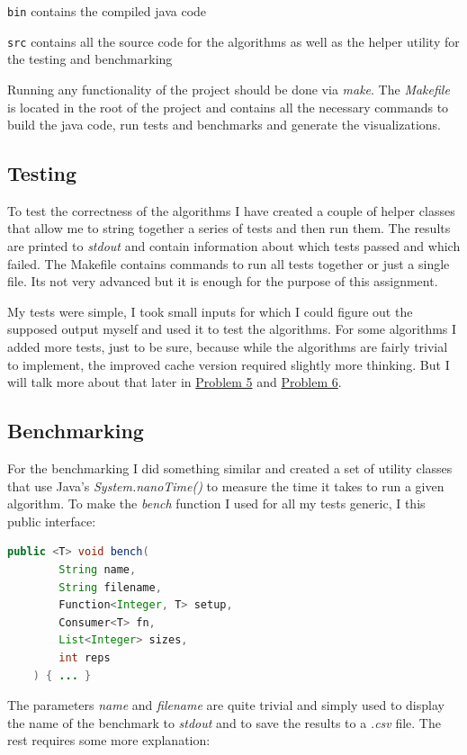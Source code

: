 \documentclass[12pt]{article}
\begin{document}
\texttt{bin} contains the compiled java code

\texttt{src} contains all the source code for the algorithms as well as the helper utility
for the testing and benchmarking

Running any functionality of the project should be done via \emph{make}. The \emph{Makefile}
is located in the root of the project and contains all the necessary commands to build the java code,
run tests and benchmarks and generate the visualizations.

\subsection{Testing}

To test the correctness of the algorithms I have created a couple of helper classes that
allow me to string together a series of tests and then run them. The results are printed
to \emph{stdout} and contain information about which tests passed and which failed. The 
Makefile contains commands to run all tests together or just a single file. Its not very
advanced but it is enough for the purpose of this assignment.

My tests were simple, I took small inputs for which I could figure out the supposed
output myself and used it to test the algorithms. For some algorithms I added more tests, just
to be sure, because while the algorithms are fairly trivial to implement, the improved cache
version required slightly more thinking. But I will talk more about that later in \hyperlink{p5}{Problem 5} and \hyperlink{p6}{Problem 6}. 

\subsection{Benchmarking}

For the benchmarking I did something similar and created a set of utility classes that use Java's
\emph{System.nanoTime()} to measure the time it takes to run a given algorithm. To make the 
\emph{bench} function I used for all my tests generic, I this public interface:

\begin{lstlisting}[language=Java]
    public <T> void bench(
        String name, 
        String filename,
        Function<Integer, T> setup,
        Consumer<T> fn,
        List<Integer> sizes,
        int reps
    ) { ... }
\end{lstlisting}


The parameters \emph{name} and \emph{filename} are quite trivial and simply used to display the name
of the benchmark to \emph{stdout} and to save the results to a \emph{.csv} file. The rest requires some more explanation:
\end{document}
